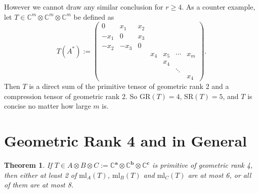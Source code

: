 \documentclass[10pt]{article} %
\newcommand{\aaa}{\mathbf{a}}
\newcommand{\bbb}{\mathbf{b}}
\newcommand{\ccc}{\mathbf{c}}
\newcommand{\GR}{\mathrm{GR}}
\newcommand{\SR}{\mathrm{SR}}
\newcommand{\ml}{\mathrm{ml}}
\newcommand{\BC}{\mathbb{C}}
\newcommand{\ot}{\otimes}
\newtheorem{thm}{Theorem}
\theoremstyle{definition}
\begin{document}
However we cannot draw any similar conclusion for $r\geq 4$. As a counter example, let $T\in\BC^m\ot\BC^m\ot\BC^m$ be defined as
$$T(A^*):=\begin{pmatrix}
0 &x_1 &x_2 & & & &\\
-x_1 &0 &x_3& & & &\\
-x_2 &-x_3&0& & & &\\
&&& x_4 & x_5 &\cdots & x_m\\
&&&   & x_4 &&\\
&&&   & &\ddots&\\
&&&   & &&x_4
\end{pmatrix}.$$
Then $T$ is a direct sum of the primitive tensor of geometric rank 2 and a compression tensor of geometric rank 2. So $\GR(T)=4$, $\SR(T)=5$, and $T$ is concise no matter how large $m$ is.


\section{Geometric Rank 4 and in General}\label{sec:gr4}
\begin{thm} \label{gr4thm}
If $T\in A\otimes B\otimes C:=\BC^{\aaa}\ot\BC^{\bbb}\ot\BC^{\ccc}$ is primitive of geometric rank 4, then either at least 2 of $\ml_A(T)$, $\ml_B(T)$ and $\ml_C(T)$ are at most 6, or all of them are at most 8.
\end{thm}
\end{document}
